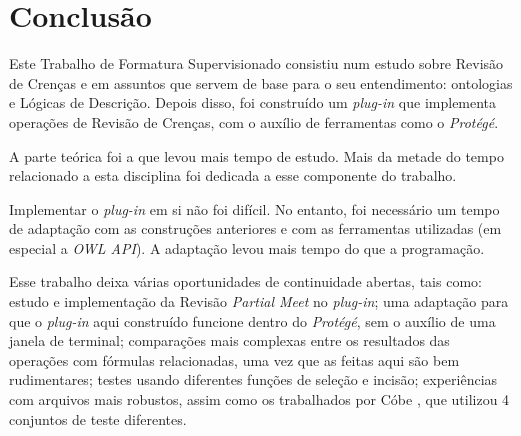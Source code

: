 \chapter{Conclusão}

Este Trabalho de Formatura Supervisionado consistiu num estudo sobre Revisão de Crenças e em assuntos que servem de base para o seu entendimento: ontologias e Lógicas de Descrição. Depois disso, foi construído um \textit{plug-in} que implementa operações de Revisão de Crenças, com o auxílio de ferramentas como o \textit{Protégé}.

A parte teórica foi a que levou mais tempo de estudo. Mais da metade do tempo relacionado a esta disciplina foi dedicada a esse componente do trabalho.

Implementar o \textit{plug-in} em si não foi difícil. No entanto, foi necessário um tempo de adaptação com as construções anteriores e com as ferramentas utilizadas (em especial a \textit{OWL API}). A adaptação levou mais tempo do que a programação.

Esse trabalho deixa várias oportunidades de continuidade abertas, tais como: estudo e implementação da Revisão \textit{Partial Meet} \citep{revisaoRibeiro2} no \textit{plug-in}; uma adaptação para que o \textit{plug-in} aqui construído funcione dentro do \textit{Protégé}, sem o auxílio de uma janela de terminal; comparações mais complexas entre os resultados das operações com fórmulas relacionadas, uma vez que as feitas aqui são bem rudimentares; testes usando diferentes funções de seleção e incisão; experiências com arquivos mais robustos, assim como os trabalhados por Cóbe \citep{revisaoCobe}, que utilizou 4 conjuntos de teste diferentes.